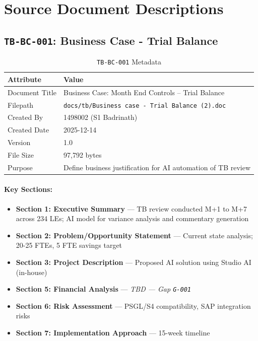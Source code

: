 \documentclass[11pt,a4paper,twoside]{report}
\newcommand{\srcref}[1]{\texttt{#1}}
\newcommand{\gapref}[1]{\texttt{#1}}
\begin{document}
\section{Source Document Descriptions}
\label{sec:source-descriptions}

\subsection{\srcref{TB-BC-001}: Business Case - Trial Balance}
\label{sec:tb-bc-001}

\begin{table}[h]
\centering
\caption{\srcref{TB-BC-001} Metadata}
\begin{tabularx}{\textwidth}{@{}L{4cm}L{10cm}@{}}
\toprule
\textbf{Attribute} & \textbf{Value} \\
\midrule
Document Title & Business Case: Month End Controls -- Trial Balance \\
Filepath & \texttt{docs/tb/Business case - Trial Balance (2).doc} \\
Created By & 1498002 (S1 Badrinath) \\
Created Date & 2025-12-14 \\
Version & 1.0 \\
File Size & 97,792 bytes \\
Purpose & Define business justification for AI automation of TB review \\
\bottomrule
\end{tabularx}
\end{table}

\paragraph{Key Sections:}
\begin{itemize}[noitemsep]
\item \textbf{Section 1: Executive Summary} --- TB review conducted M+1 to M+7 across 234 LEs; AI model for variance analysis and commentary generation
\item \textbf{Section 2: Problem/Opportunity Statement} --- Current state analysis; 20-25 FTEs, 5 FTE savings target
\item \textbf{Section 3: Project Description} --- Proposed AI solution using Studio AI (in-house)
\item \textbf{Section 5: Financial Analysis} --- \textit{TBD --- Gap \gapref{G-001}}
\item \textbf{Section 6: Risk Assessment} --- PSGL/S4 compatibility, SAP integration risks
\item \textbf{Section 7: Implementation Approach} --- 15-week timeline
\end{itemize}
\end{document}

